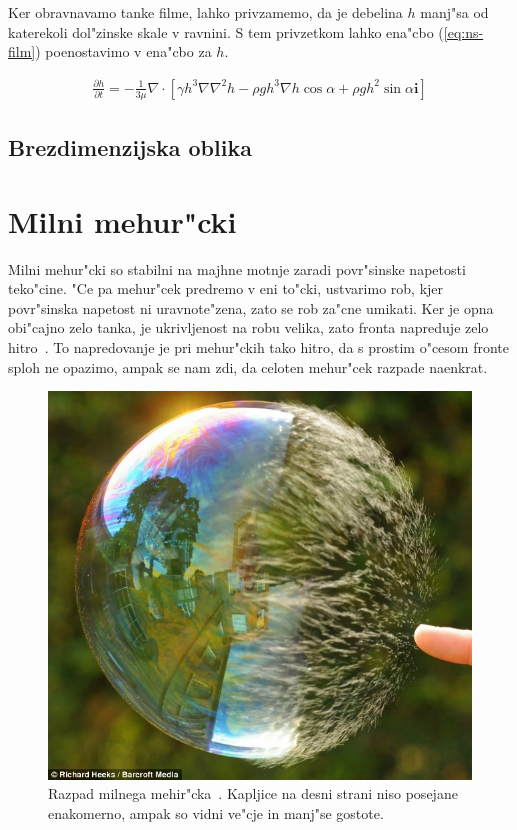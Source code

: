 \documentclass[a4paper,10pt]{article}
\renewcommand{\vec}{\mathbf}
\begin{document}
Ker obravnavamo tanke filme, lahko privzamemo, da je debelina $h$ manj"sa od katerekoli dol"zinske skale v ravnini. S tem privzetkom lahko ena"cbo (\ref{eq:ns-film}) poenostavimo v ena"cbo za $h$. 

\begin{align}
 \frac{\partial h}{\partial t} = -\frac{1}{3\mu}\nabla \cdot \left[ \gamma h^3 \nabla \nabla^2 h - \rho g h^3 \nabla h \cos \alpha + \rho g h^2 \sin \alpha \vec i \right]
\end{align}

\subsection{Brezdimenzijska oblika}

\section{Milni mehur"cki}

Milni mehur"cki so stabilni na majhne motnje zaradi povr"sinske napetosti teko"cine. "Ce pa mehur"cek predremo v eni to"cki, ustvarimo rob, kjer povr"sinska napetost ni uravnote"zena, zato se rob za"cne umikati. Ker je opna obi"cajno zelo tanka, 
je ukrivljenost na robu velika, zato fronta napreduje zelo hitro~\cite{diploma}. To napredovanje je pri mehur"ckih tako hitro, da s prostim o"cesom fronte sploh ne opazimo, ampak se nam zdi, da celoten mehur"cek razpade naenkrat. 
 
\begin{figure}[h]
 \centering
\includegraphics[width=.8\textwidth]{./Slike/bubble-3}
\caption{Razpad milnega mehir"cka~\cite{slike-mehurcek}. Kapljice na desni strani niso posejane enakomerno, ampak so vidni ve"cje in manj"se gostote. }
\end{figure}
\end{document}
